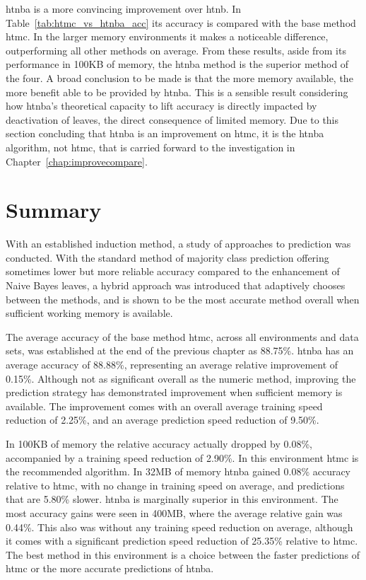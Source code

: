 {\sc htnba} is a more convincing improvement over {\sc htnb}. In Table~\ref{tab:htmc_vs_htnba_acc} its accuracy is compared with the base method {\sc htmc}. In the larger memory environments it makes a noticeable difference, outperforming all other methods on average. From these results, aside from its performance in 100KB of memory, the {\sc htnba} method is the superior method of the four. A broad conclusion to be made is that the more memory available, the more benefit able to be provided by {\sc htnba}. This is a sensible result considering how {\sc htnba}'s theoretical capacity to lift accuracy is directly impacted by deactivation of leaves, the direct consequence of limited memory. Due to this section concluding that {\sc htnba} is an improvement on {\sc htmc}, it is the {\sc htnba} algorithm, not {\sc htmc}, that is carried forward to the investigation in Chapter~\ref{chap:improvecompare}.

\section{Summary}

With an established induction method, a study of approaches to prediction was conducted. With the standard method of majority class prediction offering sometimes lower but more reliable accuracy compared to the enhancement of Naive Bayes leaves, a hybrid approach was introduced that adaptively chooses between the methods, and is shown to be the most accurate method overall when sufficient working memory is available.

The average accuracy of the base method {\sc htmc}, across all environments
and data sets, was established at the end of the previous chapter as 88.75\%.
{\sc htnba} has an average accuracy of 88.88\%, representing an average
relative improvement of 0.15\%. Although not as significant overall as the numeric method, improving the prediction strategy has demonstrated improvement when sufficient memory is available. The improvement comes with an overall average training speed reduction of 2.25\%, and an average prediction speed reduction of 9.50\%.

In 100KB of memory the relative accuracy actually dropped by 0.08\%, accompanied by a training speed reduction of 2.90\%. In this environment {\sc htmc} is the recommended algorithm. In 32MB of memory {\sc htnba} gained 0.08\% accuracy relative to {\sc htmc}, with no change in training speed on average, and predictions that are 5.80\% slower. {\sc htnba} is marginally superior in this environment. The most accuracy gains were seen in 400MB, where the average relative gain was 0.44\%. This also was without any training speed reduction on average, although it comes with a significant prediction speed reduction of 25.35\% relative to {\sc htmc}. The best method in this environment is a choice between the faster predictions of {\sc htmc} or the more accurate predictions of {\sc htnba}.
\ENDOMIT